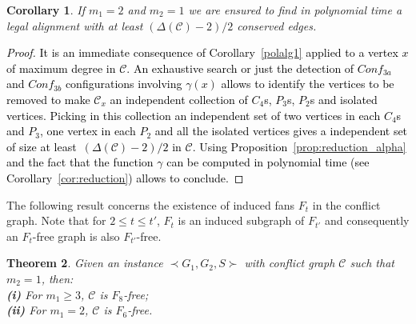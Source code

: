 \documentclass[final]{dmtcs-episciences}
\newtheorem{theorem}{Theorem}
\newtheorem{corollary}[theorem]{Corollary}
\newcommand\mar[1]{\textcolor{black}{#1}}
\begin{document}
\begin{corollary}\label{rem:degree}
If $m_1=2$ and $m_2=1$ we are ensured to find in polynomial time a legal alignment with at least 
$(\Delta(\mathcal{C})-2)/2$ conserved edges.
\end{corollary}

\mar{\begin{proof}
It is an immediate consequence of Corollary~\ref{polalg1} applied to a vertex $x$ of maximum degree in $\mathcal{C}$. An exhaustive search or just the detection of $Conf_{3a}$  and 
$Conf_{3b}$ configurations involving $\gamma(x)$ allows to identify the vertices to be removed to make $\mathcal{C}_x$ an independent collection of $C_4$s, $P_3$s, $P_2$s and isolated vertices. Picking in this collection an independent set of two vertices in each   $C_4$s and $P_3$, one vertex in each $P_2$ and all the isolated vertices gives a independent set of size at least~$(\Delta(\mathcal{C})-2)/2$ in $\mathcal{C}$. Using Proposition~\ref{prop:reduction_alpha} and the fact that the function $\gamma$ can be computed in polynomial time (see Corollary~\ref{cor:reduction}) allows to conclude. 
\end{proof}}

The following result concerns the existence of induced fans $F_t$ in the conflict graph. Note that for $2\leq t\leq t'$, $F_t$ is an induced subgraph of $F_{t'}$ and consequently an $F_t$-free graph is also $F_{t'}$-free. 



\begin{theorem}
\label{Th:F8} 
 Given an instance $\prec G_1,G_2,S \succ$ with conflict graph $\mathcal{C}$ such that $m_2=1$, then:\\
\textbf{ (i)}
For $m_1\geq 3$, $\mathcal{C}$ is $F_8$-free;\\
\textbf{ (ii)} For $m_1=2$, $\mathcal{C}$ is $F_6$-free.
\end{theorem}
\end{document}
